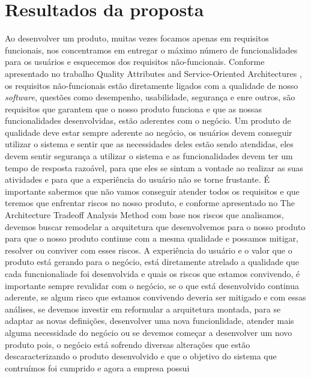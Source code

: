   \chapter{Resultados da proposta}
     Ao desenvolver um produto, muitas vezes focamos apenas em requisitos
    funcionais, nos concentramos em entregar o máximo número de funcionalidades
    para os usuários e esquecemos dos requisitos não-funcionais. Conforme apresentado
    no trabalho Quality Attributes and Service-Oriented Architectures
    \cite{O'BrienQualityAttributes2005}, os requisitos não-funcionais estão diretamente
    ligados com a qualidade de nosso \textit{software}, questões como desempenho,
    usabilidade, segurança e enre outros, são requisitos que garantem que o nosso
    produto funciona e que as nossas funcionalidades desenvolvidas, estão aderentes
    com o negócio. \newline
    Um produto de qualidade deve estar sempre aderente ao negócio, os usuários devem
    conseguir utilizar o sistema e sentir que as necessidades deles estão sendo
    atendidas, eles devem sentir segurança a utilizar o sistema e as funcionalidades
    devem ter um tempo de resposta razoável, para que eles se sintam a vontade ao
    realizar as suas atividades e para que a experiência do usuário não se torne
    frustante. É importante sabermos que não vamos conseguir atender todos os
    requisitos e que teremos que enfrentar riscos no nosso produto, e conforme
    apresentado no The Architecture Tradeoff Analysis Method \cite{KazmanTheArchitecture1998}
    com base nos riscos que analisamos, devemos buscar remodelar a arquitetura que
    desenvolvemos para o nosso produto para que o nosso produto continue com a
    mesma qualidade e possamos mitigar, resolver ou conviver com esses riscos.
    A experiência do usuário e o valor que o produto está gerando para o negócio,
    está diretamente atrelado a qualidade que cada funcnionaliade foi desenvolvida
    e quais os riscos que estamos convivendo, é importante sempre revalidar com o
    negócio, se o que está desenvolvido continua aderente, se algum risco que
    estamos convivendo deveria ser mitigado e com essas análises, se devemos
    investir em reformular a arquitetura montada, para se adaptar as novas definições,
    desenvolver uma nova funcionlidade, atender mais alguma necessidade do negócio
    ou se devemos começar a desenvolver um novo produto pois, o negócio está
    sofrendo diversas alterações que estão descaracterizando o produto desenvolvido
    e que o objetivo do sistema que contruímos foi cumprido e agora a empresa possui

